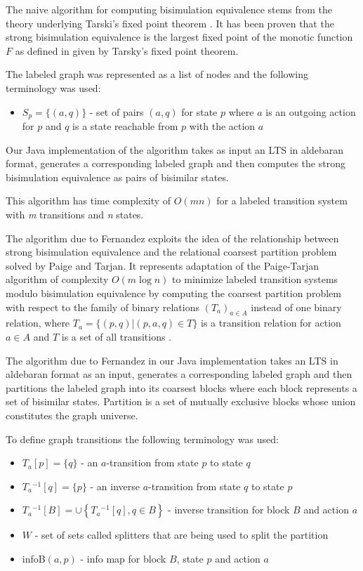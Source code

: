 The naive algorithm \cite{ReactiveSystems1} for computing bisimulation equivalence stems from the theory underlying 
Tarski's fixed point theorem \cite{ReactiveSystems2}. It has been proven that the strong bisimulation equivalence is 
the largest fixed point of the monotic function $F$ as defined in \cite{ReactiveSystems1} given by Tarsky's fixed 
point theorem. 

The labeled graph was represented as a list of nodes and the following terminology was used:
\begin{itemize}
	\item $S_p=\{(a, q)\}$ - set of pairs $(a, q)$ for state $p$ where $a$ is an outgoing action for $p$ and $q$ is a state
	reachable from $p$ with the action $a$
\end{itemize}

Our Java implementation of the algorithm takes as input an LTS in aldebaran format, generates a corresponding labeled 
graph and then computes the strong bisimulation equivalence as pairs of bisimilar states.

This algorithm has time complexity of $O(mn)$ for a labeled transition system with \emph{m} transitions and \emph{n} 
states. 

The algorithm due to Fernandez exploits the idea of the relationship between strong bisimulation equivalence 
and the relational coarsest partition problem solved by Paige and Tarjan. It represents adaptation of the 
Paige-Tarjan algorithm of complexity $O(m \log n)$ to minimize labeled transition systems modulo bisimulation 
equivalence by computing the coarsest partition problem with respect to the family of binary relations 
$\left(T_a\right)_{a\in A}$ instead of one binary relation, where $T_a=\{(p,q)|(p,a,q)\in T\}$ is a transition 
relation for action $a\in A$ and $T$ is a set of all transitions \cite{PaigeTarjan}\cite{Fernandez}.

The algorithm due to Fernandez in our Java implementation takes an LTS in aldebaran format as an input, generates a 
corresponding labeled graph and then partitions the labeled graph into its coarsest blocks where each block represents 
a set of bisimilar states. Partition is a set of mutually exclusive blocks whose union constitutes the graph universe.

To define graph transitions the following terminology was used: 
\begin{itemize}
	\item $T_a[p]=\{q\}$ - an $a$-transition from state $p$ to state $q$
	\item $T_a{}^{-1}[q]=\{p\}$ - an inverse $a$-transition from state $q$ to state $p$
	\item $T_a{}^{-1}[B]=\cup \left\{T_a{}^{-1}[q],q\in B\right\}$ - inverse transition for block $B$ and action $a$
	\item $W$ - set of sets called splitters that are being used to split the partition
	\item infoB$(a, p)$ - info map for block $B$, state $p$ and action $a$
\end{itemize}

